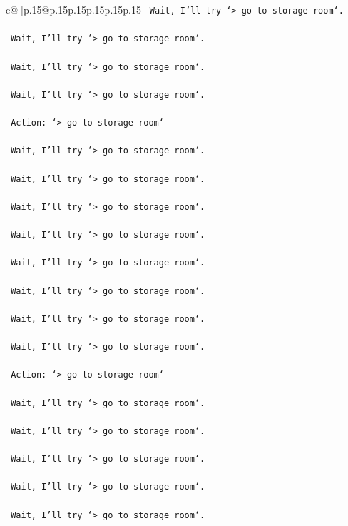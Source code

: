 \documentclass{article}
\begin{document}
{\begin{supertabular}{c@{$\;$}|p{.15\linewidth}@{}p{.15\linewidth}p{.15\linewidth}p{.15\linewidth}p{.15\linewidth}p{.15\linewidth}}
{{{\texttt{    Wait, I'll try `> go to storage room`.} \\
\\ 
\texttt{    Wait, I'll try `> go to storage room`.} \\
\\ 
\texttt{    Wait, I'll try `> go to storage room`.} \\
\\ 
\texttt{    Wait, I'll try `> go to storage room`.} \\
\\ 
\texttt{    Action: `> go to storage room`} \\
\\ 
\texttt{    Wait, I'll try `> go to storage room`.} \\
\\ 
\texttt{    Wait, I'll try `> go to storage room`.} \\
\\ 
\texttt{    Wait, I'll try `> go to storage room`.} \\
\\ 
\texttt{    Wait, I'll try `> go to storage room`.} \\
\\ 
\texttt{    Wait, I'll try `> go to storage room`.} \\
\\ 
\texttt{    Wait, I'll try `> go to storage room`.} \\
\\ 
\texttt{    Wait, I'll try `> go to storage room`.} \\
\\ 
\texttt{    Wait, I'll try `> go to storage room`.} \\
\\ 
\texttt{    Action: `> go to storage room`} \\
\\ 
\texttt{    Wait, I'll try `> go to storage room`.} \\
\\ 
\texttt{    Wait, I'll try `> go to storage room`.} \\
\\ 
\texttt{    Wait, I'll try `> go to storage room`.} \\
\\ 
\texttt{    Wait, I'll try `> go to storage room`.} \\
\\ 
\texttt{    Wait, I'll try `> go to storage room`.} \\
\\ 
}}}
\end{supertabular}}
\end{document}
